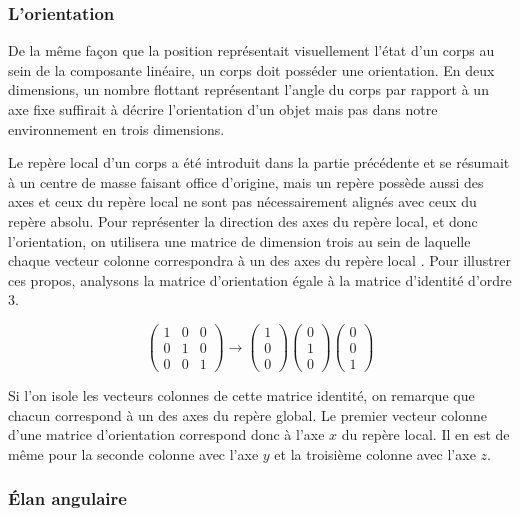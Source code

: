 \subsubsection{L'orientation}

De la même façon que la position représentait visuellement l'état d'un corps au sein de la composante linéaire, un corps doit posséder une orientation. En deux dimensions, un nombre flottant représentant l'angle du corps par rapport à un axe fixe suffirait à décrire l'orientation d'un objet mais pas dans notre environnement en trois dimensions.

Le repère local d'un corps a été introduit dans la partie précédente et se résumait à un centre de masse faisant office d'origine, mais un repère possède aussi des axes et ceux du repère local ne sont pas nécessairement alignés avec ceux du repère absolu. Pour représenter la direction des axes du repère local, et donc l'orientation, on utilisera une matrice de dimension trois au sein de laquelle chaque vecteur colonne correspondra à un des axes du repère local \cite{witkit97}. Pour illustrer ces propos, analysons la matrice d'orientation égale à la matrice d'identité d'ordre 3.

\[
\begin{pmatrix}
  1 & 0 & 0 \\
  0 & 1 & 0 \\
  0 & 0 & 1
\end{pmatrix}
\rightarrow
\begin{pmatrix}
  1 \\
  0 \\
  0 
\end{pmatrix}
\begin{pmatrix}
  0 \\
  1 \\
  0 
\end{pmatrix}
\begin{pmatrix}
  0 \\
  0 \\
  1 
\end{pmatrix}
\]

Si l'on isole les vecteurs colonnes de cette matrice identité, on remarque que chacun correspond à un des axes du repère global. Le premier vecteur colonne d'une matrice d'orientation correspond donc à l'axe $x$ du repère local. Il en est de même pour la seconde colonne avec l'axe $y$ et la troisième colonne avec l'axe $z$.

\subsubsection{\'Elan angulaire}

